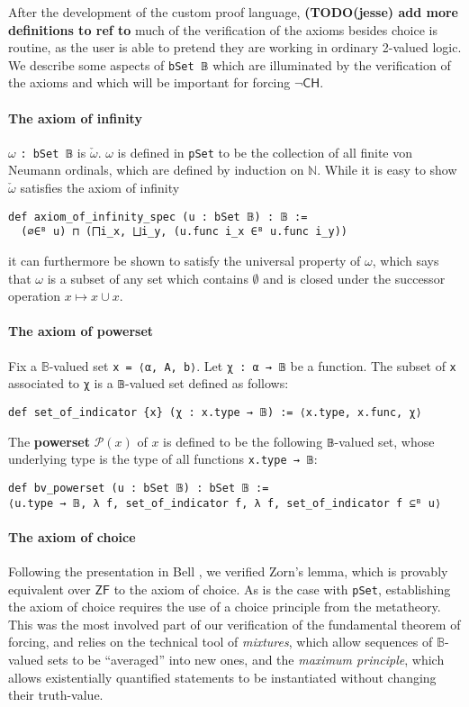 \documentclass[a4paper,USenglish,cleveref, autoref]{lipics-v2019}
\newcommand{\B}{\mathbb{B}}
\newcommand{\lil}{\lstinline}
\begin{document}
After the development of the custom proof language,
\textbf{(TODO(jesse) add more definitions to ref to}
much of the verification of the axioms besides choice is routine, as the user is able to pretend they are working in ordinary 2-valued logic. We describe some aspects of \lil{bSet 𝔹} which are illuminated by the verification of the axioms and which will be important for forcing $\neg\mathsf{CH}$.

\paragraph*{The axiom of infinity}
$\omega$ \lil{: bSet 𝔹} is $\check{\omega}$. $\omega$ is defined in \lil{pSet} to be the collection of all finite von Neumann ordinals, which are defined by induction on $\mathbb{N}$. While it is easy to show $\check{\omega}$ satisfies the axiom of infinity
\begin{lstlisting}
def axiom_of_infinity_spec (u : bSet 𝔹) : 𝔹 :=
  (∅∈ᴮ u) ⊓ (⨅i_x, ⨆i_y, (u.func i_x ∈ᴮ u.func i_y))
\end{lstlisting}
it can furthermore be shown to satisfy the universal property of $\omega$, which says that $\omega$ is a subset of any set which contains $\emptyset$ and is closed under the successor operation $x \mapsto x \cup {x}$.

\paragraph*{The axiom of powerset}
\begin{definition}
  Fix a $\B$-valued set \lil{x = ⟨α, A, b⟩}. Let \lil{χ : α → 𝔹} be a function. The subset of \lil{x} associated to \lil{χ} is a \lil{𝔹}-valued set defined as follows:
  \begin{lstlisting}
def set_of_indicator {x} (χ : x.type → 𝔹) := ⟨x.type, x.func, χ⟩
\end{lstlisting}

The \textbf{powerset} $\mathcal{P}(x)$ of $x$ is defined to be the following \lil{𝔹}-valued set, whose underlying type is the type of all functions \lil{x.type → 𝔹}:
\begin{lstlisting}
def bv_powerset (u : bSet 𝔹) : bSet 𝔹 :=
⟨u.type → 𝔹, λ f, set_of_indicator f, λ f, set_of_indicator f ⊆ᴮ u⟩
\end{lstlisting}
\end{definition}

\paragraph*{The axiom of choice}
Following the presentation in Bell \cite{bell1}, we verified Zorn's lemma, which is provably equivalent over $\mathsf{ZF}$ to the axiom of choice. As is the case with \lil{pSet}, establishing the axiom of choice requires the use of a choice principle from the metatheory. This was the most involved part of our verification of the fundamental theorem of forcing, and relies on the technical tool of \emph{mixtures}, which allow sequences of $\B$-valued sets to be ``averaged'' into new ones, and the \emph{maximum principle}, which allows existentially quantified statements to be instantiated without changing their truth-value.
\end{document}
